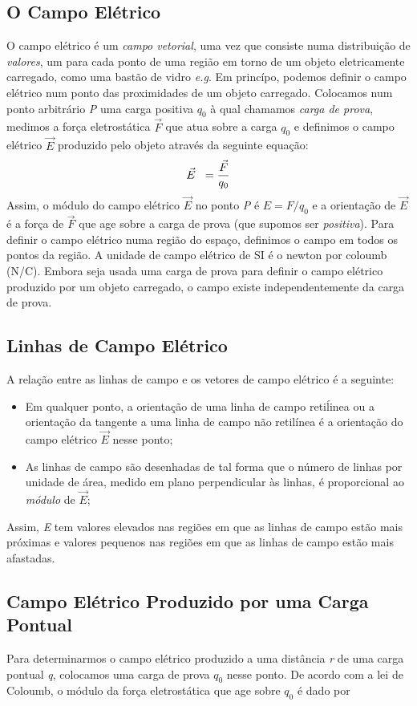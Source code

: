 \documentclass{article}
\begin{document}
\subsection{O Campo Elétrico}
O campo elétrico é um \textit{campo vetorial}, uma vez que consiste numa distribuição de \textit{valores}, um para cada ponto de uma região em torno de um objeto eletricamente carregado, como uma bastão de vidro \textit{e.g}. Em princípo, podemos definir o campo elétrico num ponto das proximidades de um objeto carregado. Colocamos num ponto arbitrário \textit{P} uma carga positiva \textit{$q_0$} à qual chamamos \textit{carga de prova}, medimos a força eletrostática \(\vec{F}\) que atua sobre a carga \textit{$q_0$} e definimos o campo elétrico \(\vec{E}\) produzido pelo objeto através da seguinte equação:
\newline
\[\vec{E} \hspace{0.2cm}= \frac{\vec{F}}{q_0}\]
\newline
Assim, o módulo do campo elétrico \(\vec{E}\) no ponto \textit{P} é \(\textit{E} = \textit{F/}\textit{$q_0$}\) e a orientação de \(\vec{E}\) é a força de \(\vec{F}\) que age sobre a carga de prova (que supomos ser \textit{positiva}). Para definir o campo elétrico numa região do espaço, definimos o campo em todos os pontos da região. A unidade de campo elétrico de SI é o newton por coloumb (N/C).
\newline
Embora seja usada uma carga de prova para definir o campo elétrico produzido por um objeto carregado, o campo existe independentemente da carga de prova.
\subsection{Linhas de Campo Elétrico}
A relação entre as linhas de campo e os vetores de campo elétrico é a seguinte:
\begin{itemize}
    \item Em qualquer ponto, a orientação de uma linha de campo retiĺinea ou a orientação da tangente a uma linha de campo não retilínea é a orientação do campo elétrico \(\vec{E}\) nesse ponto;
    \item As linhas de campo são desenhadas de tal forma que o número de linhas por unidade de área, medido em plano perpendicular às linhas, é proporcional ao \textit{módulo} de \(\vec{E}\);
\end{itemize}
Assim, \textit{E} tem valores elevados nas regiões em que as linhas de campo estão mais próximas e valores pequenos nas regiões em que as linhas de campo estão mais afastadas.
\subsection{Campo Elétrico Produzido por uma Carga Pontual}
Para determinarmos o campo elétrico produzido a uma distância \textit{r} de uma carga pontual \textit{q}, colocamos uma carga de prova \textit{$q_0$} nesse ponto. De acordo com a lei de Coloumb, o módulo da força eletrostática que age sobre \textit{$q_0$} é dado por
\end{document}
